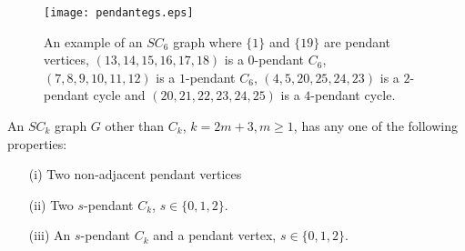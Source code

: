 \documentclass[runningheads]{llncs}
\begin{document}
\begin{figure}[h]
\centering
\texttt{[image: pendantegs.eps]}
\caption{An example of an $SC_6$ graph where $\{1\}$ and $\{19\}$ are pendant vertices, $(13,14,15,16,17,18)$ is a $0$-pendant $C_6$, $(7,8,9,10,11,12)$ is a $1$-pendant $C_6$, $(4,5,20,25,24,23)$ is a $2$-pendant cycle and $(20,21,22,23,24,25)$ is a $4$-pendant cycle.}
\end{figure}

\begin{lemma}
\label{specialvertex2k+1}
An $SC_k$ graph $G$ other than $C_k$, $k = 2m+3, m \geq 1$, has any one of the following properties:
\begin{itemize}
\item[(i)] Two non-adjacent pendant vertices
\item[(ii)] Two $s$-pendant $C_k$, $s \in \{0,1,2\}$.
\item[(iii)] An $s$-pendant $C_k$ and a pendant vertex, $s \in \{0,1,2\}$.
\end{itemize}
\end{lemma}
\end{document}
